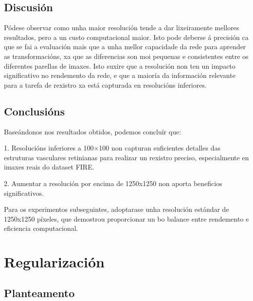 
\subsection{Discusión}
\label{subsec:Discusion-resolution}

Pódese observar como unha maior resolución tende a dar lixeiramente mellores resultados, pero a un custo computacional maior.
Isto pode deberse á precisión ca que se fai a evaluación mais que a unha mellor capacidade da rede para aprender as transformacións, xa que as diferencias son moi pequenas e consistentes entre os diferentes parellas de imaxes.
Isto suxire que a resolución non ten un impacto significativo no rendemento da rede, e que a maioría da información relevante para a tarefa de rexistro xa está capturada en resolucións inferiores.


\subsection{Conclusións}
\label{subsec:Conclusions-resolution}

Baseándonos nos resultados obtidos, podemos concluír que:

1. Resolucións inferiores a 100×100 non capturan suficientes detalles das estruturas vasculares retinianas para realizar un rexistro preciso, especialmente en imaxes reais do dataset FIRE.

2. Aumentar a resolución por encima de 1250x1250 non aporta beneficios significativos.


Para os experimentos subseguintes, adoptarase unha resolución estándar de 1250x1250 píxeles, que demostrou proporcionar un bo balance entre rendemento e eficiencia computacional.

\section{Regularización}
\label{sec:Regularización}

\subsection{Planteamento}
\label{subsec:Planteamento-regularization}

